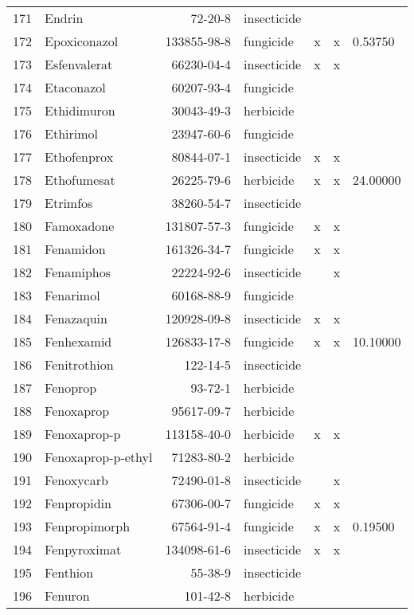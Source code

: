\begin{longtable}{lp{3cm}rlp{1cm}p{1cm}p{1.5cm}}
  171 & Endrin & 72-20-8 & insecticide &  &  &  \\ 
  172 & Epoxiconazol & 133855-98-8 & fungicide & x & x & 0.53750 \\ 
  173 & Esfenvalerat & 66230-04-4 & insecticide & x & x &  \\ 
  174 & Etaconazol & 60207-93-4 & fungicide &  &  &  \\ 
  175 & Ethidimuron & 30043-49-3 & herbicide &  &  &  \\ 
  176 & Ethirimol & 23947-60-6 & fungicide &  &  &  \\ 
  177 & Ethofenprox & 80844-07-1 & insecticide & x & x &  \\ 
  178 & Ethofumesat & 26225-79-6 & herbicide & x & x & 24.00000 \\ 
  179 & Etrimfos & 38260-54-7 & insecticide &  &  &  \\ 
  180 & Famoxadone & 131807-57-3 & fungicide & x & x &  \\ 
  181 & Fenamidon & 161326-34-7 & fungicide & x & x &  \\ 
  182 & Fenamiphos & 22224-92-6 & insecticide &  & x &  \\ 
  183 & Fenarimol & 60168-88-9 & fungicide &  &  &  \\ 
  184 & Fenazaquin & 120928-09-8 & insecticide & x & x &  \\ 
  185 & Fenhexamid & 126833-17-8 & fungicide & x & x & 10.10000 \\ 
  186 & Fenitrothion & 122-14-5 & insecticide &  &  &  \\ 
  187 & Fenoprop & 93-72-1 & herbicide &  &  &  \\ 
  188 & Fenoxaprop & 95617-09-7 & herbicide &  &  &  \\ 
  189 & Fenoxaprop-p & 113158-40-0 & herbicide & x & x &  \\ 
  190 & Fenoxaprop-p-ethyl & 71283-80-2 & herbicide &  &  &  \\ 
  191 & Fenoxycarb & 72490-01-8 & insecticide &  & x &  \\ 
  192 & Fenpropidin & 67306-00-7 & fungicide & x & x &  \\ 
  193 & Fenpropimorph & 67564-91-4 & fungicide & x & x & 0.19500 \\ 
  194 & Fenpyroximat & 134098-61-6 & insecticide & x & x &  \\ 
  195 & Fenthion & 55-38-9 & insecticide &  &  &  \\ 
  196 & Fenuron & 101-42-8 & herbicide &  &  &  \\ 

\end{longtable}
